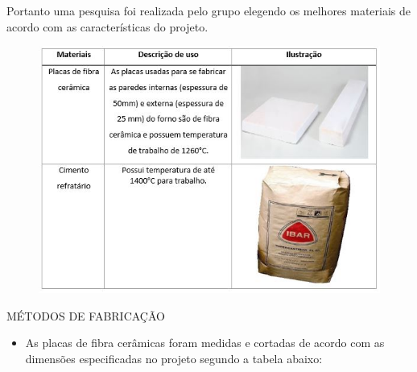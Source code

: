 Portanto uma pesquisa foi realizada pelo grupo elegendo os melhores materiais de acordo com as características do projeto.

\begin{figure}[ht]
	\centering
	\label{res1}
	\includegraphics[keepaspectratio=true,scale=0.8]{figuras/res1.JPG}
\end{figure}

MÉTODOS DE FABRICAÇÃO
\begin{itemize}
	\item As placas de fibra cerâmicas foram medidas e cortadas de acordo com as dimensões especificadas no projeto segundo a tabela abaixo:
\end{itemize}

